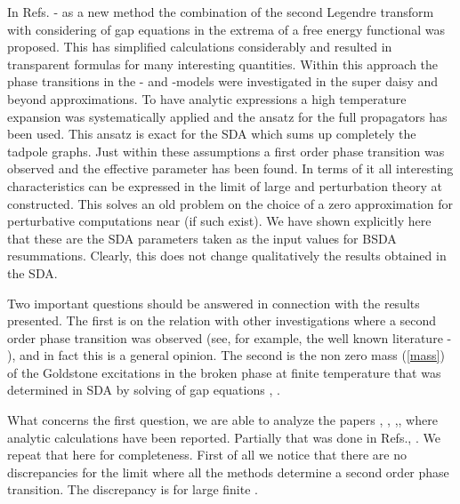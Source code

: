\documentclass[a4paper,12pt]{article}
\begin{document}
In Refs.\cite{Bordag1} - \cite{pl} as a new method the combination of
the second Legendre transform with considering of gap equations in the
extrema of a free energy functional was proposed. This has simplified
calculations considerably and resulted in transparent formulas for
many interesting quantities.  Within this approach the phase
transitions in the \coordHE{} - and \coordHE{}-models were investigated in the
super daisy and beyond approximations. To have analytic expressions a
high temperature expansion was systematically applied and the ansatz
for the full propagators \coordHE{} has been used. This
ansatz is exact for the SDA which sums up completely the tadpole
graphs.  Just within these assumptions a first order phase transition
was observed and the effective parameter \myHighlight{$\epsilon$}\coordHE{} has been found. In
terms of it all interesting characteristics can be expressed in the
limit of large \coordHE{} and perturbation theory at \coordHE{}
constructed. This solves an old problem on the choice of a zero
approximation for perturbative computations near \coordHE{} (if such
exist).  We have shown explicitly here that these are the SDA
parameters taken as the input values for BSDA resummations. Clearly,
this does not change qualitatively the results obtained in the SDA.

Two important questions should be answered  in connection with the
  results presented. The first is on the relation with other investigations
where a second order phase transition was observed (see, for example,
 the well known literature \cite {Zinn} - \cite{Fodor}), and in fact this is a
general opinion. The second is the non zero mass
(\ref{mass}) of the Goldstone excitations in the broken phase  at
finite temperature  that was determined in SDA by solving of gap
equations \cite{prd}, \cite{pl}. 

What concerns the first question, we are able to analyze the papers
\cite{Tetradis}, \cite{Reuter} \cite{Elmfors},
\cite{Ogure1},\cite{Ogure2}, where analytic calculations have been
reported. Partially that was done in Refs.\cite{prd}, \cite{pl}. We
repeat that here for completeness.  First of all we notice that there
are no discrepancies for the limit \coordHE{} where all the
methods determine a second order phase transition. The discrepancy is
for large finite \coordHE{}.
\end{document}
